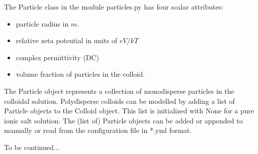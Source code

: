 The \textsf{Particle} class in the module \textsf{particles.py} has four scalar attributes:

\begin{itemize}
	\item particle radius in $m$.
	\item relative zeta potential in units of $ eV/kT $
	\item complex permittivity (DC)
	\item volume fraction of particles in the colloid.
\end{itemize}

The \textsf{Particle} object represents a collection of monodisperse particles in the colloidal solution. Polydisperse colloids can be modelled by adding a \textsf{list} of \textsf{Particle} objects to the \textsf{Colloid} object. This list is initialized with \textsf{None} for a pure ionic salt solution. The (list of) Particle objects can be added or appended to manually or read from  the configuration file in *.yml format.

% 

To be continued...

\newpage
